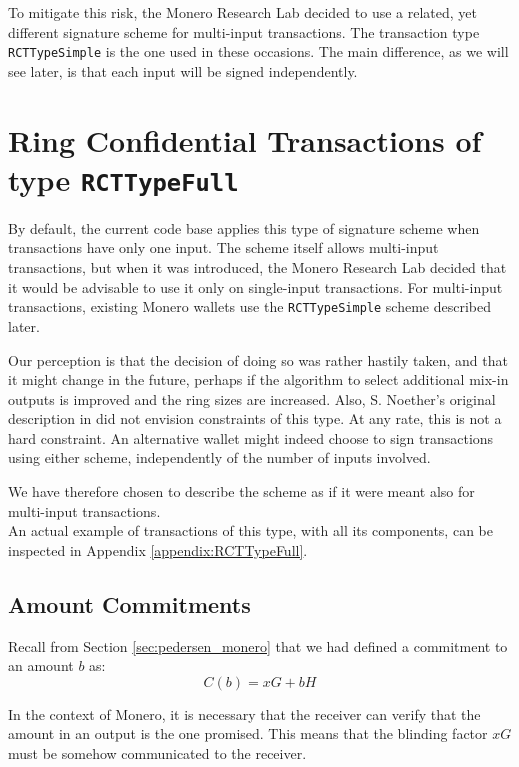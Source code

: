 To mitigate this risk, the Monero Research Lab decided to use a related, yet different signature scheme
for multi-input transactions. The transaction type {\tt RCTTypeSimple} is the one used in these
occasions. The main difference, as we will see later, is that each input will be signed independently.



\section{ Ring Confidential Transactions of type {\tt RCTTypeFull}}

By default, the current code base applies this type of signature scheme when transactions have only one
input. The scheme itself allows multi-input transactions, but when it was introduced, the Monero Research Lab
decided that it would be advisable to use it only on single-input transactions.
For multi-input transactions, existing Monero wallets use the {\tt RCTTypeSimple} scheme described later.

Our perception is that the decision of doing so was rather hastily taken, and that it might change in the future,
perhaps if the algorithm to select additional mix-in outputs is improved and the ring sizes are increased.
Also, S. Noether's original description in \cite{ledger34} did not envision constraints of this type.
At any rate, this is not a hard constraint. 
An alternative wallet might indeed choose to sign transactions using either scheme, independently of the
number of inputs involved.

We have therefore chosen to describe the scheme as if it were meant also for multi-input transactions.
\\

An actual example of transactions of this type, with all its components, can be inspected
in Appendix \ref{appendix:RCTTypeFull}.


\subsection{Amount Commitments}
\label{amount-commitments}
Recall from Section \ref{sec:pedersen_monero} that we had defined a commitment to an amount \(b\) as:
\[C(b) = x G + b H\]

In the context of Monero, it is necessary that the receiver can verify that the amount in an output is the one promised. This means that the blinding factor \(x G\) must be somehow communicated to the receiver.

